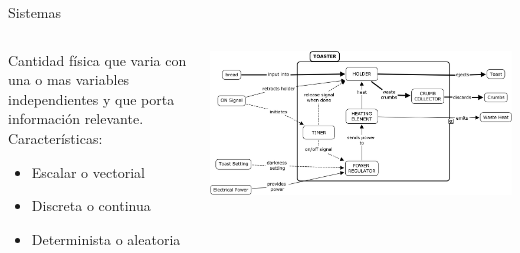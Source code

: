 \documentclass[aspectratio=169]{beamer}
\begin{document}
\begin{frame}{Sistemas}
    \begin{columns}[onlytextwidth]
        \begin{column}{0.5\textwidth}
        Cantidad física que varia con una o mas variables independientes y que porta información relevante.\\[8pt]
        Características: 
            \begin{itemize}
                \item Escalar o vectorial 
                \item Discreta o continua
                \item Determinista o aleatoria
            \end{itemize}    
        \end{column}
        \begin{column}{0.5\textwidth}
            \begin{center}
               \includegraphics[scale=0.5]{fig/tostadora.jpg}
            \end{center}
        \end{column}
    \end{columns}
\end{frame}


\end{document}
